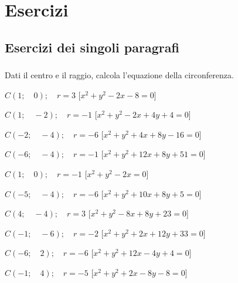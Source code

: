 
\section{Esercizi}

\subsection{Esercizi dei singoli paragrafi}

\subsubsection*{}
\begin{esercizio}\label{ese:}
 Dati il centro e il raggio, calcola l'equazione della circonferenza.
 \begin{enumeratea}
  \item  \(C \left (1; \quad 0 \right ); \quad r = 3\)
   \hfill [\(x^2 + y^2 -2x -8 = 0\)]
  \item  \(C \left (1; \quad -2 \right ); \quad r = -1\)
   \hfill [\(x^2 + y^2 -2x +4y +4 = 0\)]
  \item  \(C \left (-2; \quad -4 \right ); \quad r = -6\)
   \hfill [\(x^2 + y^2 +4x +8y -16 = 0\)]
  \item  \(C \left (-6; \quad -4 \right ); \quad r = -1\)
   \hfill [\(x^2 + y^2 +12x +8y +51 = 0\)]
  \item  \(C \left (1; \quad 0 \right ); \quad r = -1\)
   \hfill [\(x^2 + y^2 -2x  = 0\)]
  \item  \(C \left (-5; \quad -4 \right ); \quad r = -6\)
   \hfill [\(x^2 + y^2 +10x +8y +5 = 0\)]
  \item  \(C \left (4; \quad -4 \right ); \quad r = 3\)
   \hfill [\(x^2 + y^2 -8x +8y +23 = 0\)]
  \item  \(C \left (-1; \quad -6 \right ); \quad r = -2\)
   \hfill [\(x^2 + y^2 +2x +12y +33 = 0\)]
  \item  \(C \left (-6; \quad 2 \right ); \quad r = -6\)
   \hfill [\(x^2 + y^2 +12x -4y +4 = 0\)]
  \item  \(C \left (-1; \quad 4 \right ); \quad r = -5\)
   \hfill [\(x^2 + y^2 +2x -8y -8 = 0\)]
 \end{enumeratea}
\end{esercizio}


